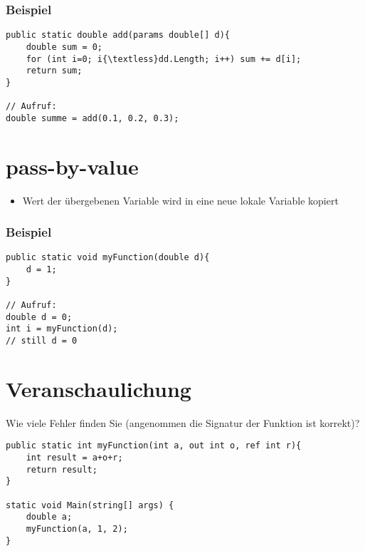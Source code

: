 \subsubsection*{Beispiel}
\begin{lstlisting}[language={[Sharp]C}]
public static double add(params double[] d){
	double sum = 0; 
	for (int i=0; i{\textless}dd.Length; i++) sum += d[i];
	return sum;
}

// Aufruf: 
double summe = add(0.1, 0.2, 0.3);
\end{lstlisting}
\section{pass-by-value}
\begin{itemize}
\item Wert der übergebenen Variable wird in eine neue lokale Variable kopiert
\end{itemize}
\subsubsection*{Beispiel}
\begin{lstlisting}[language={[Sharp]C}]
public static void myFunction(double d){
	d = 1;
}

// Aufruf: 
double d = 0;
int i = myFunction(d);
// still d = 0 
\end{lstlisting}

\section{Veranschaulichung}
Wie viele Fehler finden Sie (angenommen die Signatur der Funktion ist korrekt)?
\begin{lstlisting}[language={[Sharp]C}]
public static int myFunction(int a, out int o, ref int r){ 
	int result = a+o+r; 
	return result; 
} 

static void Main(string[] args) { 
	double a; 
	myFunction(a, 1, 2); 
}
\end{lstlisting}
